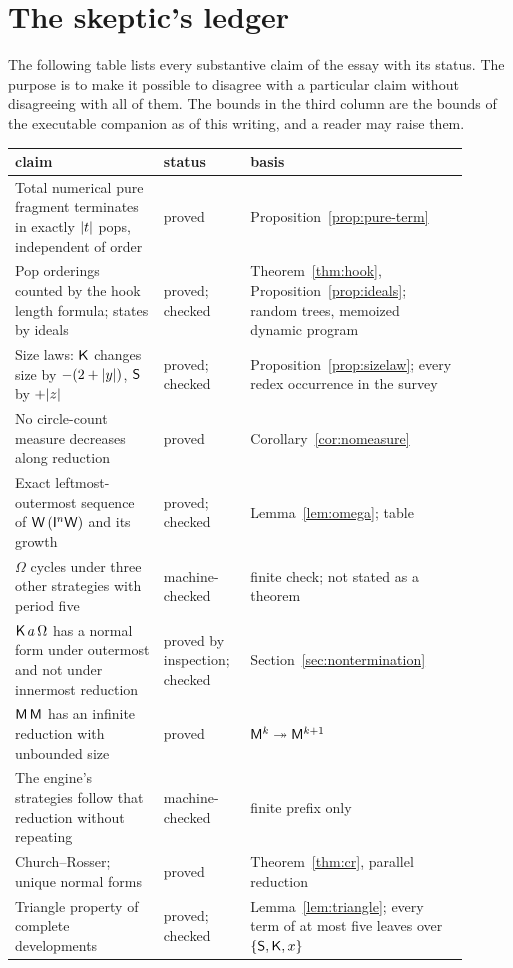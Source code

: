 \section{The skeptic's ledger}\label{sec:ledger}

The following table lists every substantive claim of the essay with its status. The purpose is to make it possible to disagree with a particular claim without disagreeing with all of them. The bounds in the third column are the bounds of the executable companion as of this writing, and a reader may raise them.

{\small
\begin{longtable}{p{0.30\linewidth}p{0.16\linewidth}p{0.44\linewidth}}
\toprule
claim & status & basis \\
\midrule
\endhead
Total numerical pure fragment terminates in exactly $\lvert t\rvert$ pops, independent of order & proved & Proposition~\ref{prop:pure-term} \\
Pop orderings counted by the hook length formula; states by ideals & proved; checked & Theorem~\ref{thm:hook}, Proposition~\ref{prop:ideals}; random trees, memoized dynamic program \\
Size laws: $\mathsf{K}$ changes size by $-(2+\lvert y\rvert)$, $\mathsf{S}$ by $+\lvert z\rvert$ & proved; checked & Proposition~\ref{prop:sizelaw}; every redex occurrence in the survey \\
No circle-count measure decreases along reduction & proved & Corollary~\ref{cor:nomeasure} \\
Exact leftmost-outermost sequence of $\mathsf{W}\,(\mathsf{I}^n\mathsf{W})$ and its growth & proved; checked & Lemma~\ref{lem:omega}; table \\
$\Omega$ cycles under three other strategies with period five & machine-checked & finite check; not stated as a theorem \\
$\mathsf{K}\,a\,\Omega$ has a normal form under outermost and not under innermost reduction & proved by inspection; checked & Section~\ref{sec:nontermination} \\
$\mathsf{M}\,\mathsf{M}$ has an infinite reduction with unbounded size & proved & $\mathsf{M}^k\twoheadrightarrow\mathsf{M}^{k+1}$ \\
The engine's strategies follow that reduction without repeating & machine-checked & finite prefix only \\
Church--Rosser; unique normal forms & proved & Theorem~\ref{thm:cr}, parallel reduction \\
Triangle property of complete developments & proved; checked & Lemma~\ref{lem:triangle}; every term of at most five leaves over $\{\mathsf{S},\mathsf{K},x\}$ \\

\end{longtable}}
